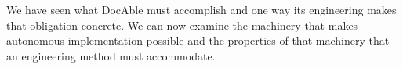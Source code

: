 
We have seen what DocAble must accomplish and one way its engineering makes that obligation concrete. We can now examine the machinery that makes autonomous implementation possible and the properties of that machinery that an engineering method must accommodate.
